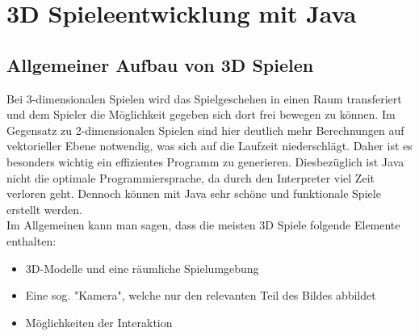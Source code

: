 \chapter{3D Spieleentwicklung mit Java}\label{ch:beispiele}

\section{Allgemeiner Aufbau von 3D Spielen}\label{sec:aufbau}

Bei 3-dimensionalen Spielen wird das Spielgeschehen in einen Raum transferiert und dem Spieler die Möglichkeit gegeben sich dort frei bewegen zu können. \newline
Im Gegensatz zu 2-dimensionalen Spielen sind hier deutlich mehr Berechnungen auf vektorieller Ebene notwendig, was sich auf die Laufzeit niederschlägt. Daher ist es besonders wichtig ein effizientes Programm zu generieren.
Diesbezüglich ist Java nicht die optimale Programmiersprache, da durch den Interpreter viel Zeit verloren geht. \newline
Dennoch können mit Java sehr schöne und funktionale Spiele erstellt werden.
\\
Im Allgemeinen kann man sagen, dass die meisten 3D Spiele folgende Elemente enthalten:
\begin{itemize}
	\item 3D-Modelle und eine räumliche Spielumgebung
	\item Eine sog. "Kamera", welche nur den relevanten Teil des Bildes abbildet
	\item Möglichkeiten der Interaktion
\end{itemize}



\bigskip

